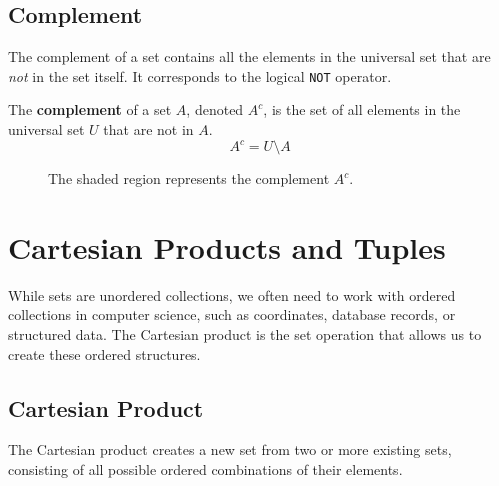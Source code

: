 \subsection*{Complement}
The complement of a set contains all the elements in the universal set that are \textit{not} in the set itself. It corresponds to the logical \texttt{NOT} operator.

\begin{definition}[Complement]
    The \textbf{complement} of a set $A$, denoted $A^c$, is the set of all elements in the universal set $U$ that are not in $A$.
    \[ A^c = U \setminus A \]
\end{definition}

\begin{figure}[htbp]
    \centering
    \caption{The shaded region represents the complement $A^c$.}
    \label{fig:complement_custom}
\end{figure}

\section{Cartesian Products and Tuples}
While sets are unordered collections, we often need to work with ordered collections in computer science, such as coordinates, database records, or structured data. The Cartesian product is the set operation that allows us to create these ordered structures.

\subsection*{Cartesian Product}
The Cartesian product creates a new set from two or more existing sets, consisting of all possible ordered combinations of their elements.

